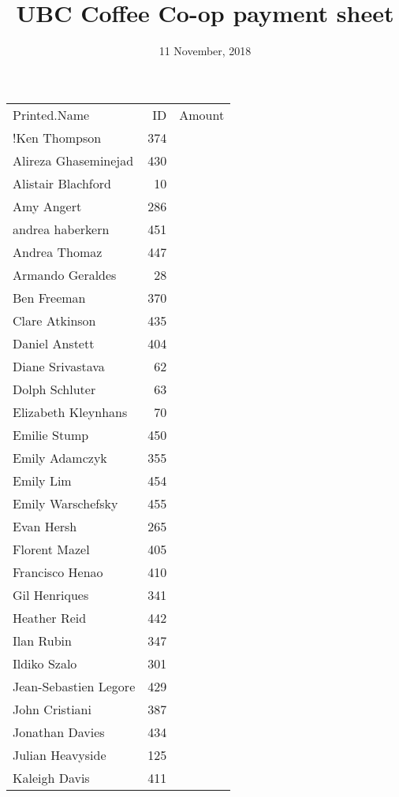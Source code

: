 \documentclass[]{article}
\title{UBC Coffee Co-op payment sheet}
\author{}
\date{11 November, 2018}
\begin{document}
\maketitle

\begin{longtable}{lrl}
 Printed.Name & ID & Amount \\ 
 !Ken Thompson & 374 &  \\ 
   \hline
Alireza Ghaseminejad & 430 &  \\ 
   \hline
Alistair Blachford &  10 &  \\ 
   \hline
Amy Angert & 286 &  \\ 
   \hline
andrea haberkern & 451 &  \\ 
   \hline
Andrea Thomaz & 447 &  \\ 
   \hline
Armando Geraldes &  28 &  \\ 
   \hline
Ben Freeman & 370 &  \\ 
   \hline
Clare Atkinson & 435 &  \\ 
   \hline
Daniel Anstett & 404 &  \\ 
   \hline
Diane Srivastava &  62 &  \\ 
   \hline
Dolph Schluter &  63 &  \\ 
   \hline
Elizabeth Kleynhans &  70 &  \\ 
   \hline
Emilie Stump & 450 &  \\ 
   \hline
Emily Adamczyk & 355 &  \\ 
   \hline
Emily Lim & 454 &  \\ 
   \hline
Emily Warschefsky & 455 &  \\ 
   \hline
Evan Hersh & 265 &  \\ 
   \hline
Florent Mazel & 405 &  \\ 
   \hline
Francisco Henao & 410 &  \\ 
   \hline
Gil Henriques & 341 &  \\ 
   \hline
Heather Reid & 442 &  \\ 
   \hline
Ilan Rubin & 347 &  \\ 
   \hline
Ildiko Szalo & 301 &  \\ 
   \hline
Jean-Sebastien Legore & 429 &  \\ 
   \hline
John Cristiani & 387 &  \\ 
   \hline
Jonathan Davies & 434 &  \\ 
   \hline
Julian Heavyside & 125 &  \\ 
   \hline
Kaleigh Davis & 411 &  \\ 

\end{longtable}
\end{document}
